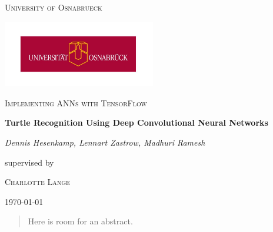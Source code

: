 \documentclass[11pt]{article}
\begin{document}
\begin{titlepage}
	\centering
	{\scshape\LARGE University of Osnabrueck \par}
	\vspace{1cm}
	\includegraphics[width=0.5\textwidth]{images/Logo-Uni-Osnabrueck.jpg}\par\vspace{2cm}
	\vspace{0.75cm}
	{\scshape\Large Implementing ANNs with TensorFlow\par}
	\vspace{1.5cm}
	{\huge\bfseries Turtle Recognition Using Deep Convolutional Neural Networks\par}
	\vspace{1.5cm}
	{\Large\itshape Dennis Hesenkamp, Lennart Zastrow,  Madhuri Ramesh\par}
	\vspace{1.5cm}
	supervised by\par
	\textsc{Charlotte Lange}
	\vfill

	{\large \today\par}
\end{titlepage}

\tableofcontents
\newpage

\begin{abstract}
    Here is room for an abstract.
\end{abstract}












\newpage

\end{document}
